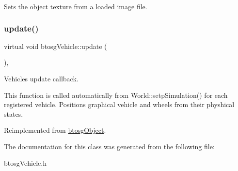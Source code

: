 Sets the object texture from a loaded image file. \mbox{\label{classbtosgVehicle_a5fd0f471df492ac232c9b772a28bd2b9}} 
\subsubsection{\texorpdfstring{update()}{update()}}
{\footnotesize\ttfamily virtual void btosg\+Vehicle\+::update (\begin{DoxyParamCaption}{ }\end{DoxyParamCaption})\hspace{0.3cm}{\ttfamily [inline]}, {\ttfamily [virtual]}}

Vehicle\textquotesingle{}s update callback.

This function is called automatically from World\+::setp\+Simulation() for each registered vehicle. Positions graphical vehicle and wheels from their physhical states. 

Reimplemented from \hyperlink{classbtosgObject_a342917817dfde62554f83da8e0d5110b}{btosg\+Object}.



The documentation for this class was generated from the following file\+:\begin{DoxyCompactItemize}
\item 
btosg\+Vehicle.\+h\end{DoxyCompactItemize}
